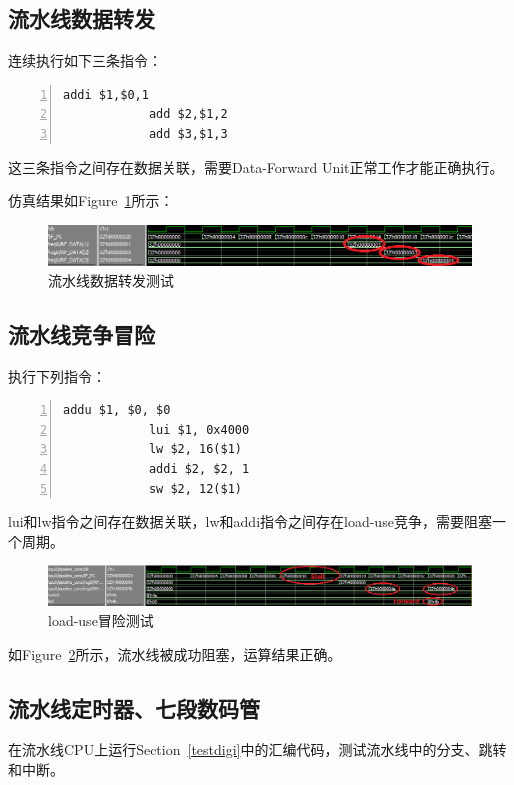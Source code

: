 \documentclass{article}
\begin{document}
        \subsection{流水线数据转发}
            连续执行如下三条指令：
            \begin{Verbatim}[frame=lines,numbers=left,stepnumber=5,label={test\_dataforward.asm}]
            addi $1,$0,1
            add $2,$1,2
            add $3,$1,3
            \end{Verbatim}
            这三条指令之间存在数据关联，需要Data-Forward Unit正常工作才能正确执行。

            仿真结果如Figure~\ref{fig:pipeline_dataforwardtest}所示：
            \begin{figure}[H]
                \centering
                \includegraphics[width=\textwidth]{images/pipeline_dataforwardtest.png}
                \caption{\label{fig:pipeline_dataforwardtest}流水线数据转发测试}
            \end{figure}

        \subsection{流水线竞争冒险}
            执行下列指令：
            \begin{Verbatim}[frame=lines,numbers=left,stepnumber=5,label={test\_loaduse.asm}]
            addu $1, $0, $0
            lui $1, 0x4000
            lw $2, 16($1)
            addi $2, $2, 1
            sw $2, 12($1)
            \end{Verbatim}
            lui和lw指令之间存在数据关联，lw和addi指令之间存在load-use竞争，需要阻塞一个周期。
            \begin{figure}[H]
                \centering
                \includegraphics[width=\textwidth]{images/pipeline_loadusetest.png}
                \caption{\label{fig:pipeline_loadusetest}load-use冒险测试}
            \end{figure}
            如Figure~\ref{fig:pipeline_loadusetest}所示，流水线被成功阻塞，运算结果正确。

        \subsection{流水线定时器、七段数码管}
            在流水线CPU上运行Section~\ref{testdigi}中的汇编代码，测试流水线中的分支、跳转和中断。
            
\end{document}
